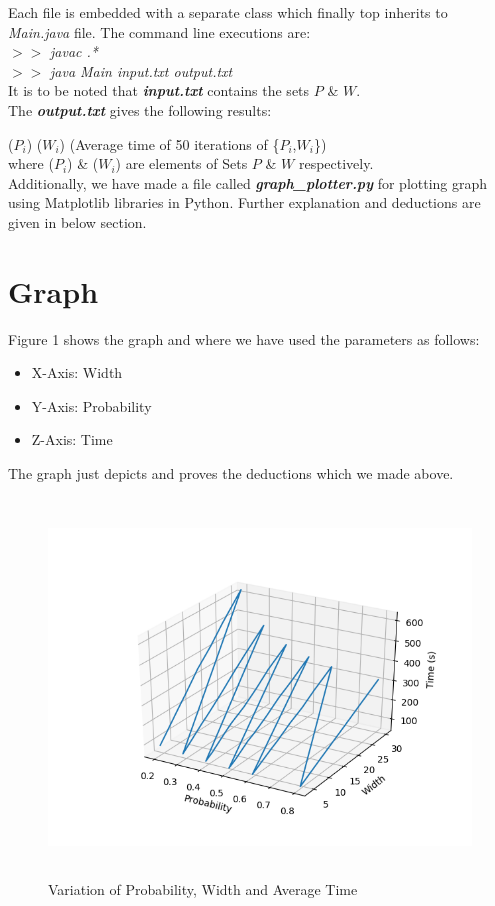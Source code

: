 \documentclass[12pt]{article}
\begin{document}
Each file is embedded with a separate class which finally top inherits to \textit{Main.java} file. The command line executions are: \\
$>>$ \textit{javac .*} \\
$>>$ \textit{java Main input.txt output.txt} \\ 

It is to be noted that \textbf{\textit{input.txt}} contains the sets $P$ \& $W$.
\\


The \textbf{\textit{output.txt}} gives the following results: 


($P_i$) ($W_i$) (Average time of 50 iterations of \{$P_i$,$W_i$\})
\\
where ($P_i$) \& ($W_i$) are elements of Sets $P$ \& $W$ respectively. \\

Additionally, we have made a file called \textbf{\textit{graph\_plotter.py}} for plotting graph using Matplotlib libraries in Python. Further explanation and deductions are given in below section.

\section{Graph}
Figure 1 shows the graph and where we have used the parameters as follows:
\begin{itemize}
    \item X-Axis: Width
    \item Y-Axis: Probability
    \item Z-Axis: Time
\end{itemize}

The graph just depicts and proves the deductions which we made above.
\begin{center}
    \begin{figure}
        \centering
        \includegraphics[width=15cm, height=10cm]{graph.png}
        \caption{Variation of Probability, Width and Average Time}
    \end{figure}
\end{center}
\end{document}
